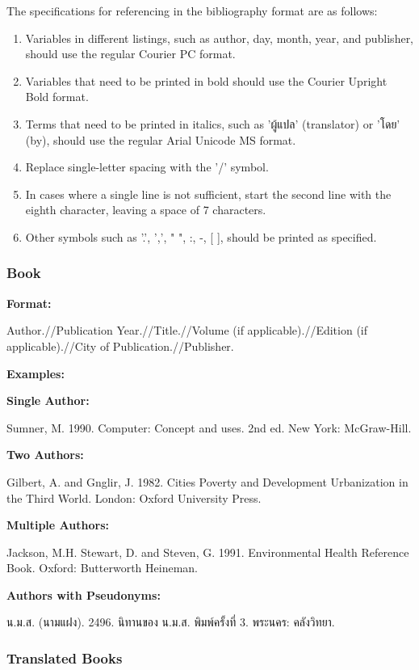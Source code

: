 The specifications for referencing in the bibliography format are as follows:
\begin{enumerate}
    \item Variables in different listings, such as author, day, month, year, and publisher, should use the regular Courier PC format.
    \item Variables that need to be printed in bold should use the Courier Upright Bold format.
    \item Terms that need to be printed in italics, such as 'ผู้แปล' (translator) or 'โดย' (by), should use the regular Arial Unicode MS format.
    \item Replace single-letter spacing with the '/' symbol.
    \item In cases where a single line is not sufficient, start the second line with the eighth character, leaving a space of 7 characters.
    \item Other symbols such as '.', ',', " ", :, -, [ ], should be printed as specified.
\end{enumerate}

\subsubsection{Book}

\textbf{Format:}

Author.//Publication Year.//Title.//Volume (if applicable).//Edition (if applicable).//City of Publication.//Publisher.

\textbf{Examples:}

\textbf{Single Author:}

Sumner, M. 1990. Computer: Concept and uses. 2nd ed. New York: McGraw-Hill.

\textbf{Two Authors:}

Gilbert, A. and Gnglir, J. 1982. Cities Poverty and Development Urbanization in the Third World. London: Oxford University Press.

\textbf{Multiple Authors:}

Jackson, M.H. Stewart, D. and Steven, G. 1991. Environmental Health Reference Book. Oxford: Butterworth Heineman.

\textbf{Authors with Pseudonyms:}

น.ม.ส. (นามแฝง). 2496. นิทานของ น.ม.ส. พิมพ์ครั้งที่ 3. พระนคร: คลังวิทยา.

\subsubsection{Translated Books}

